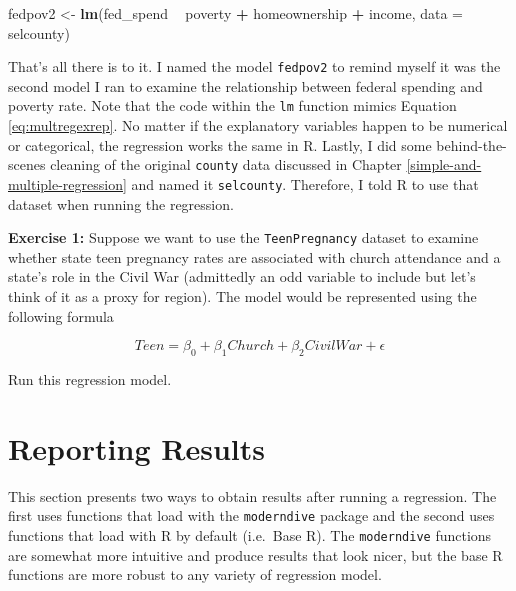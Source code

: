 \documentclass[
]{book}
\newenvironment{Shaded}{\begin{snugshade}}{\end{snugshade}}
\newcommand{\DataTypeTok}[1]{\textcolor[rgb]{0.13,0.29,0.53}{#1}}
\newcommand{\KeywordTok}[1]{\textcolor[rgb]{0.13,0.29,0.53}{\textbf{#1}}}
\newcommand{\NormalTok}[1]{#1}
\newcommand{\OperatorTok}[1]{\textcolor[rgb]{0.81,0.36,0.00}{\textbf{#1}}}
\newcommand{\StringTok}[1]{\textcolor[rgb]{0.31,0.60,0.02}{#1}}
\newenvironment{learncheck}%
{%
  \par\vspace{\baselineskip}\noindent 
  \color{Exercise}\begin{itshape}%
  \par\vspace{\baselineskip}\noindent\ignorespaces 
}%
{%
  \end{itshape}\ignorespacesafterend 
}
\begin{document}
\begin{Shaded}
\begin{Highlighting}[]
\NormalTok{fedpov2 <-}\StringTok{ }\KeywordTok{lm}\NormalTok{(fed_spend }\OperatorTok{~}\StringTok{ }\NormalTok{poverty }\OperatorTok{+}\StringTok{ }\NormalTok{homeownership }\OperatorTok{+}\StringTok{ }\NormalTok{income, }\DataTypeTok{data =}\NormalTok{ selcounty)}
\end{Highlighting}
\end{Shaded}

That's all there is to it. I named the model \texttt{fedpov2} to remind myself it was the second model I ran to examine the relationship between federal spending and poverty rate. Note that the code within the \texttt{lm} function mimics Equation \eqref{eq:multregexrep}. No matter if the explanatory variables happen to be numerical or categorical, the regression works the same in R. Lastly, I did some behind-the-scenes cleaning of the original \texttt{county} data discussed in Chapter \ref{simple-and-multiple-regression} and named it \texttt{selcounty}. Therefore, I told R to use that dataset when running the regression.

\begin{learncheck}
\textbf{Exercise 1:} Suppose we want to use the \texttt{TeenPregnancy}
dataset to examine whether state teen pregnancy rates are associated
with church attendance and a state's role in the Civil War (admittedly
an odd variable to include but let's think of it as a proxy for region).
The model would be represented using the following formula

\begin{equation}
Teen = \beta_0 + \beta_1Church + \beta_2CivilWar + \epsilon
\end{equation}

Run this regression model.
\end{learncheck}

\hypertarget{reporting-results}{%
\section{Reporting Results}\label{reporting-results}}

This section presents two ways to obtain results after running a regression. The first uses functions that load with the \texttt{moderndive} package and the second uses functions that load with R by default (i.e.~Base R). The \texttt{moderndive} functions are somewhat more intuitive and produce results that look nicer, but the base R functions are more robust to any variety of regression model.
\end{document}
